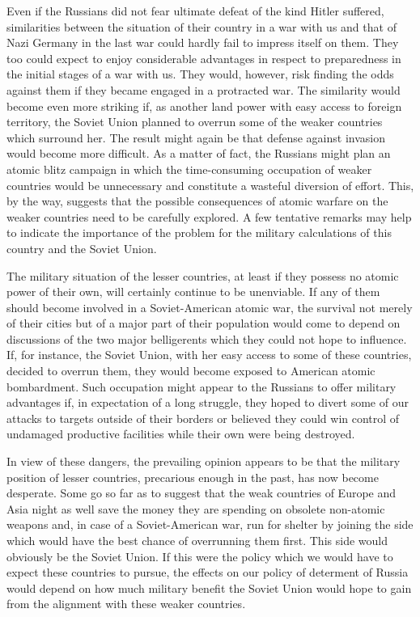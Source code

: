 Even if the Russians did not fear ultimate defeat of the kind Hitler suffered, similarities between the situation of their country in a war with us and that of Nazi Germany in the last war could hardly fail to impress itself on them. They too could expect to enjoy considerable advantages in respect to preparedness in the initial stages of a war with us. They would, however, risk finding the odds against them if they became engaged in a protracted war. The similarity would become even more striking if, as another land power with easy access to foreign territory, the Soviet Union planned to overrun some of the weaker countries which surround her. The result might again be that defense against invasion would become more difficult. As a matter of fact, the Russians might plan an atomic blitz campaign in which the time-consuming occupation of weaker countries would be unnecessary and constitute a wasteful diversion of effort. This, by the way, suggests that the possible consequences of atomic warfare on the weaker countries need to be carefully explored. A few tentative remarks may help to indicate the importance of the problem for the military calculations of this country and the Soviet Union.

The military situation of the lesser countries, at least if they possess no atomic power of their own, will certainly continue to be unenviable. If any of them should become involved in a Soviet-American atomic war, the survival not merely of their cities but of a major part of their population would come to depend on discussions of the two major belligerents which they could not hope to influence. If, for instance, the Soviet Union, with her easy access to some of these countries, decided to overrun them, they would become exposed to American atomic bombardment. Such occupation might appear to the Russians to offer military advantages if, in expectation of a long struggle, they hoped to divert some of our attacks to targets outside of their borders or believed they could win control of undamaged productive facilities while their own were being destroyed.

In view of these dangers, the prevailing opinion appears to be that the military position of lesser countries, precarious enough in the past, has now become desperate. Some go so far as to suggest that the weak countries of Europe and Asia night as well save the money they are spending on obsolete non-atomic weapons and, in case of a Soviet-American war, run for shelter by joining the side which would have the best chance of overrunning them first. This side would obviously be the Soviet Union. If this were the policy which we would have to expect these countries to pursue, the effects on our policy of determent of Russia would depend on how much military benefit the Soviet Union would hope to gain from the alignment with these weaker countries.

